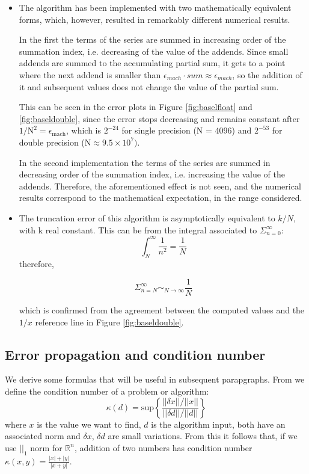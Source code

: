 \documentclass[a4paper,11]{article}
\newcommand{\R}{\mathbb{R}}
\begin{document}
\begin{itemize}
	\item{
		The algorithm has been implemented with two mathematically equivalent 
		forms, which, however, resulted in remarkably different numerical
		results.
		
		In the first the terms of the series are summed in increasing order of 
		the summation index, i.e. decreasing of the value of the addends. Since
		small addends are summed to the accumulating partial sum, it gets to a 
		point where the next addend is smaller than $\epsilon_{mach} 
		\cdot sum \approx \epsilon_{mach}$,
		so the addition of it and subsequent values does not change 
		the value of the partial sum.
		
		This can be seen in the error plots in Figure 
		\ref{fig:baselfloat} and \ref{fig:baseldouble},
		since the error stops decreasing and remains constant 
		after $ \mathrm{1/N^{2}} = \epsilon_{ \mathrm{mach} } $,
		which is $2^{-24}$ for single precision (N = 4096) and 
		$2^{-53}$ for double precision ($\mathrm{N} \approx 9.5 \times 10^{7}).$
		
		In the second implementation the terms of the series are summed in decreasing
		order of the summation index, i.e. increasing the value of the addends. Therefore,
		the aforementioned effect is not seen, and the numerical results correspond 
		to the mathematical expectation, in the range considered.
	}
	\item{
		The truncation error of this algorithm is asymptotically equivalent to
		$k/N$, with k real constant. This can be from the integral associated
		to $ \Sigma_{n=0}^{\infty} $:
		\[ \int^{\infty}_{N} \frac{1}{n^{2}} = \frac{1}{N}\]
		therefore,
		
		\[ \Sigma_{n=N}^{\infty} \sim_{N \to \infty } \frac{1}{N} \]
		
		which is confirmed from the agreement between the computed values and
		the $1/x$ reference line in Figure \ref{fig:baseldouble}.
		}
\end{itemize}

\subsection{Error propagation and condition number}

We derive some formulas that will be useful in subsequent parapgraphs.
From \textcite[2.1]{quarteroni} we define the condition number of a problem
or algorithm:
\begin{equation}
	\kappa(d) = \mathrm{sup}\left\{ \frac{||\delta x||/||x||}
		{||\delta d||/||d||}\right\}
\end{equation}
where $x$ is the value we want to find, $d$ is the algorithm input, both 
have an associated norm and $\delta x$, $\delta d$ are small variations.
From this it follows that, if we use $||_{1}$ norm for $\R^{n}$,
addition of two numbers has condition number 
$\kappa(x,y) = \frac{|x|+|y|}{|x+y|}$.
\end{document}
